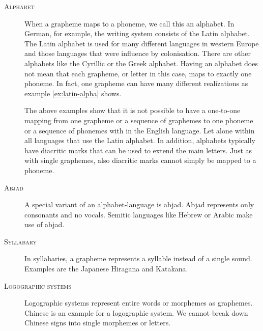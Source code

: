 \begin{description}
\item[\textsc{Alphabet}] When a grapheme maps to a phoneme, we call this an alphabet. In German, for example, the writing system consists of the Latin alphabet. The Latin alphabet is used for many different languages in western Europe and those languages that were influence by colonisation. There are other alphabets like the Cyrillic or the Greek alphabet. Having an alphabet does not mean that each grapheme, or letter in this case, maps to exactly one phoneme. In fact, one grapheme can have many different realizations as example \ref{ex:latin-alpha} shows.

The above examples show that it is not possible to have a one-to-one mapping from one grapheme or a sequence of graphemes to one phoneme or a sequence of phonemes with in the English language. Let alone within all languages that use the Latin alphabet. In addition, alphabets typically have diacritic marks that can be used to extend the main letters. Just as with single graphemes, also diacritic marks cannot simply be mapped to a phoneme.

\item[\textsc{Abjad}] A special variant of an alphabet-language is abjad. Abjad represents only consonants and no vocals. Semitic languages like Hebrew or Arabic make use of abjad.

\begin{covsubexamples}[preamble={Hebrew examples that are first mapped to Latin alphabet then to phonemes.}]
\label{ex:abjad}
\item
\end{covsubexamples}
\item[\textsc{Syllabary}] In syllabaries, a grapheme represents a syllable instead of a single sound. Examples are the Japanese Hiragana and Katakana.
\item[\textsc{Logographic systems}] Logographic systems represent entire words or morphemes as graphemes. Chinese is an example for a logographic system. We cannot break down Chinese signs into single morphemes or letters. 
\end{description}


